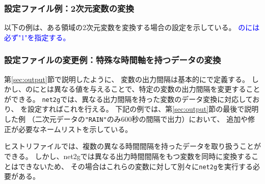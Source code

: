 \subsubsection{設定ファイル例：2次元変数の変換}
\label{subsec:net2g_2d}
以下の例は、ある領域の2次元変数を変換する場合の設定を示している。
\textcolor{blue}{のには必ず"1"を指定する。}


\subsubsection{設定ファイルの変更例：特殊な時間軸を持つデータの変換}

第\ref{sec:output}節で説明したように、
変数の出力間隔は基本的にで定義する。
しかし、のにとは異なる値を与えることで、特定の変数の出力間隔を変更することができる。
\verb|net2g|では、異なる出力間隔を持った変数のデータ変換に対応しており、
を設定すればこれを行える。
下記の例では、第\ref{sec:output}節の最後で説明した例
（二次元データの\verb|"RAIN"|のみ600秒の間隔で出力）において、
追加や修正が必要なネームリストを示している。

ヒストリファイルでは、複数の異なる時間間隔を持ったデータを取り扱うことができる。
しかし、net2gでは異なる出力時間間隔をもつ変数を同時に変換することはできないため、
その場合はこれらの変数に対して別々に\verb|net2g|を実行する必要がある。

